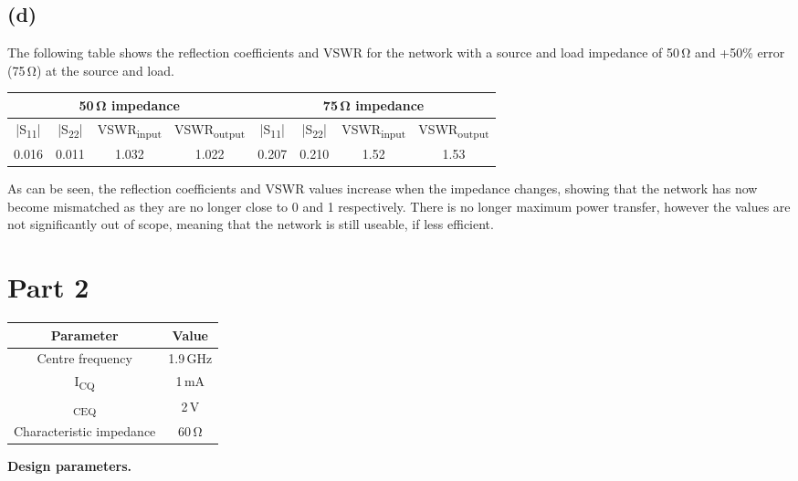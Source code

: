 \documentclass[12pt]{article}
\begin{document}
\subsection*{(d)} 
The following table shows the reflection coefficients and VSWR for the network 
with a source and load impedance of 50\,\unit{\ohm} and +50\% error (75\,\unit{\ohm}) at the source and load.

\begin{center}
\begin{tabular}{|c | c | c | c || c | c | c | c|}
    \hline
    \multicolumn{4}{|c||}{50\,\unit{\ohm} impedance} & \multicolumn{4}{c|}{75\,\unit{\ohm} impedance} \\
    \hline
    |S\textsubscript{11}| & |S\textsubscript{22}| & VSWR\textsubscript{input} & VSWR\textsubscript{output} & |S\textsubscript{11}| & |S\textsubscript{22}| & VSWR\textsubscript{input} & VSWR\textsubscript{output} \\
    \hline
    0.016 & 0.011 & 1.032 & 1.022 & 0.207 & 0.210 & 1.52 & 1.53 \\
    \hline
\end{tabular}
\end{center}


As can be seen, the reflection coefficients and VSWR values increase when the impedance changes,
showing that the network has now become mismatched as they are no longer close to 0 and 1 respectively. 
There is no longer maximum power transfer, however the values are not significantly out of scope,
meaning that the network is still useable, if less efficient.

\section*{Part 2}
\begin{center}
\begin{tabular}{|c|c|}
\hline
\textbf{Parameter} & \textbf{Value} \\
\hline
Centre frequency & 1.9\,\unit{\giga\hertz} \\
I\textsubscript{CQ}& 1\,\unit{\milli\ampere} \\
\textsubscript{CEQ}& 2\,\unit{\volt} \\
Characteristic impedance& 60\,\unit{\ohm} \\
\hline
\end{tabular}

\textbf{Design parameters.}
\end{center}
\end{document}
